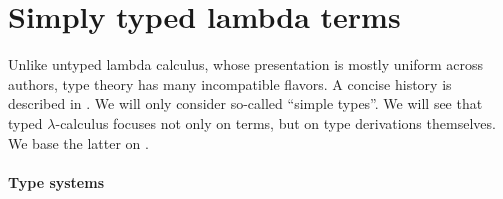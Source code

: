 \section{Simply typed lambda terms}\label{sec:simply_typed_lambda_terms}

Unlike untyped lambda calculus, whose presentation is mostly uniform across authors, type theory has many incompatible flavors. A concise history is described in . We will only consider so-called \enquote{simple types}. We will see that typed \( \lambda \)-calculus focuses not only on terms, but on type derivations themselves. We base the latter on .

\paragraph{Type systems}

